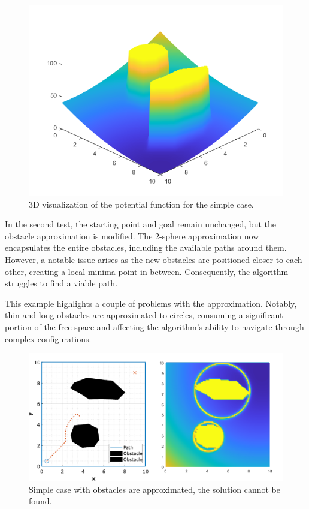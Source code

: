\documentclass{IEEEtaes}
\begin{document}
{\begin{figure}[t]
    \vspace{-1em}
    \begin{center}    
        \includegraphics[width=0.8\linewidth]{simple-pot.png}
    \end{center}
     \caption{3D visualization of the potential function for the simple case.}
     \label{simple-pot}
\end{figure}

In the second test, the starting point and goal remain unchanged, but the obstacle approximation is modified. The 2-sphere approximation now encapsulates the entire obstacles, including the available paths around them. However, a notable issue arises as the new obstacles are positioned closer to each other, creating a local minima point in between. Consequently, the algorithm struggles to find a viable path.

This example highlights a couple of problems with the approximation. Notably, thin and long obstacles are approximated to circles, consuming a significant portion of the free space and affecting the algorithm's ability to navigate through complex configurations.

\begin{figure}
    \vspace{-1em}
    \begin{center}    
        \includegraphics[width=1\linewidth]{simple-2.pdf}
    \end{center}
     \caption{Simple case with obstacles are approximated, the solution cannot be found.}
     \label{simple-2}
\end{figure}

}
\end{document}
